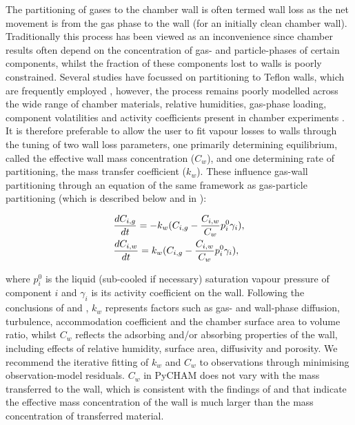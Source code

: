 \documentclass[gmd, manuscript]{copernicus}
\begin{document}
The partitioning of gases to the chamber wall is often termed wall loss as the net movement is from the gas phase to the wall (for an initially clean chamber wall).  Traditionally this process has been viewed as an inconvenience since chamber results often depend on the concentration of gas- and particle-phases of certain components, whilst the fraction of these components lost to walls is poorly constrained.  Several studies have focussed on partitioning to Teflon walls, which are frequently employed \citep{Matsunaga2010, Zhang2015b, Zhao2018}, however, the process remains poorly modelled across the wide range of chamber materials, relative humidities, gas-phase loading, component volatilities and activity coefficients present in chamber experiments \citep[e.g.][]{Day2017, Stefenelli2018}.  It is therefore preferable to allow the user to fit vapour losses to walls through the tuning of two wall loss parameters, one primarily determining equilibrium, called the effective wall mass concentration ($C_w$), and one determining rate of partitioning, the mass transfer coefficient ($k_w$).  These influence gas-wall partitioning through an equation of the same framework as gas-particle partitioning (which is described below and in \citet{Zaveri2008}):

\begin{align} \label{eq:gas_wall_partit}
	&\frac{dC_{i,g}}{dt} = -k_{w}(C_{i,g}-\frac{C_{i,w}}{C_{w}}p^{0}_{i}\gamma_{i})\rm{,}\\
	&\frac{dC_{i,w}}{dt} = k_{w}(C_{i,g}-\frac{C_{i,w}}{C_{w}}p^{0}_{i}\gamma_{i})\rm{,}
\end{align}

where $p^{0}_{i}$ is the liquid (sub-cooled if necessary) saturation vapour pressure of component $i$ and $\gamma_{i}$ is its activity coefficient on the wall.  Following the conclusions of \citet{Matsunaga2010} and \citet{Zhang2015b}, $k_{w}$ represents factors such as gas- and wall-phase diffusion, turbulence, accommodation coefficient and the chamber surface area to volume ratio, whilst $C_{w}$ reflects the adsorbing and/or absorbing properties of the wall, including effects of relative humidity, surface area, diffusivity and porosity.  We recommend the iterative fitting of $k_{w}$ and $C_{w}$ to observations through minimising observation-model residuals.  $C_{w}$ in PyCHAM does not vary with the mass transferred to the wall, which is consistent with the findings of \citet{Matsunaga2010} and \citet{Zhang2015b} that indicate the effective mass concentration of the wall is much larger than the mass concentration of transferred material.
\end{document}
